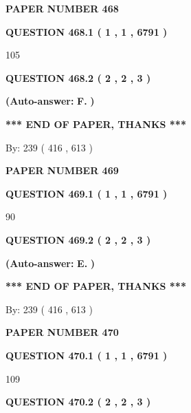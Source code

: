 \documentclass{ctexart}
\begin{document}
   
\newpage 
\setcounter{page}{ 
   468001 } 
   
   
 {\textbf{ \Large{ PAPER NUMBER  468  }}}
   
   
   
   
  
  
{\textbf{\large{QUESTION
468.1 
 ( 1 , 1 , 6791 )
}}}

105
  
  
{\textbf{\large{QUESTION
468.2 
 ( 2 , 2 , 3 )
}}}
 
 
{\textbf{(Auto-answer:}}
{\textbf{\large{
F.}}}
{\textbf{)}}
 
 
   
   
   
   
\vspace{1.0in} 
{\textbf{\large{ *** END OF PAPER, THANKS *** }}} 
   
   
\hspace{1.0in} By: 
 239 ( 416 ,  613 )
   
   
   
   
\newpage 
\setcounter{page}{ 
   469001 } 
   
   
 {\textbf{ \Large{ PAPER NUMBER  469  }}}
   
   
   
   
  
  
{\textbf{\large{QUESTION
469.1 
 ( 1 , 1 , 6791 )
}}}

90
  
  
{\textbf{\large{QUESTION
469.2 
 ( 2 , 2 , 3 )
}}}
 
 
{\textbf{(Auto-answer:}}
{\textbf{\large{
E.}}}
{\textbf{)}}
 
 
   
   
   
   
\vspace{1.0in} 
{\textbf{\large{ *** END OF PAPER, THANKS *** }}} 
   
   
\hspace{1.0in} By: 
 239 ( 416 ,  613 )
   
   
   
   
\newpage 
\setcounter{page}{ 
   470001 } 
   
   
 {\textbf{ \Large{ PAPER NUMBER  470  }}}
   
   
   
   
  
  
{\textbf{\large{QUESTION
470.1 
 ( 1 , 1 , 6791 )
}}}

109
  
  
{\textbf{\large{QUESTION
470.2 
 ( 2 , 2 , 3 )
}}}
 
\end{document}
